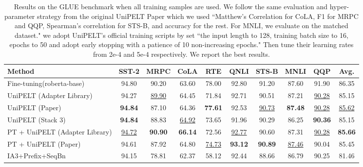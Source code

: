 \documentclass[10pt,twocolumn,letterpaper]{article}
\begin{document}
\begin{table*}[!htbp]
\small %
  \centering
  \begin{tabular}{lccccccccc}
    \toprule
    \textbf{Method} & \textbf{SST-2} & \textbf{MRPC} & \textbf{CoLA} & \textbf{RTE} & \textbf{QNLI} & \textbf{STS-B} & \textbf{MNLI} & \textbf{QQP} & \textbf{Avg.} \\
\hline
    \midrule
    Fine-tuning(roberta-base) & 94.80 & 90.20 & 63.60 & 78.00 & 92.80 & 91.20 & 87.60 & 91.90 & 86.35 \\
\hline
    UniPELT (Adapter Library) & 94.27 & \underline{89.90} & 64.45 & 71.84 & 92.71 & 90.51 & 87.21 & \underline{90.28} & 85.15 \\
    UniPELT (Paper) & \textbf{94.84}  & 87.10 & 64.36 & \textbf{77.61} & 92.53 & \underline{90.73} & \textbf{87.48} & \underline{90.28} &  \underline{85.62} \\
    UniPELT (Stack 3) & \textbf{94.84} & 88.83 &  \underline{64.92} & 73.65 & 91.96 & 90.29 & 86.25 & \textbf{90.36} & 85.15 \\
    PT + UniPELT (Adapter Library) & \underline{94.72}  &  \textbf{90.90} & \textbf{66.14} & 72.56 & \underline{92.77} & 90.60 & 87.31 & \underline{90.28} &  \textbf{85.66} \\
    PT + UniPELT (Paper) & 94.61 & 87.92 & 64.80 & \underline{74.73}  & \textbf{93.12} &\textbf{90.89} & \underline{87.46} & 90.04 & 85.45 \\
    IA3+Prefix+SeqBn & 94.15 & 78.81 & 62.37 & 58.12 & 92.44 & 88.66 & 86.79 & 90.25 & 81.46 \\
\hline
    \bottomrule
  \end{tabular}
  \caption{Results on the GLUE benchmark when all training samples are used.  We follow the same evaluation and hyper-parameter strategy from the original UniPELT Paper\cite{Mao2022UniPELT} which we used ``Matthew’s Correlation for CoLA, F1 for MRPC and QQP, Spearman’s correlation for STS-B, and accuracy for the rest. For MNLI, we evaluate on the matched dataset." we adopt UniPELT's official training scripts by set ``the input length to 128, training batch size to 16, epochs to 50 and adopt early stopping with a patience of 10 non-increasing epochs." Then tune their learning rates from {2e-4 and 5e-4} respectively. We report the best results. }
  \label{tab:table2}
\end{table*}
\end{document}
